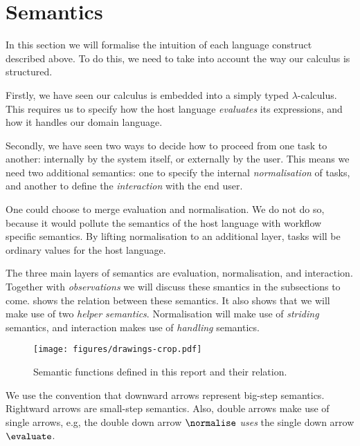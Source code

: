 


\section{Semantics}
\label{sec:semantics}

In this section we will formalise the intuition of each language construct described above.
To do this,
we need to take into account the way our calculus is structured.

Firstly,
we have seen our calculus is embedded into a simply typed $\lambda$-calculus.
This requires us to specify how the host language \emph{evaluates} its expressions,
and how it handles our domain language.

Secondly,
we have seen two ways to decide how to proceed from one task to another:
internally by the system itself, or externally by the user.
This means we need two additional semantics:
one to specify the internal \emph{normalisation} of tasks,
and another to define the \emph{interaction} with the end user.

One could choose to merge evaluation and normalisation.
We do not do so,
because it would pollute the semantics of the host language with workflow specific semantics.
By lifting normalisation to an additional layer,
tasks will be ordinary values for the host language.

The three main layers of semantics are evaluation, normalisation, and interaction.
Together with \emph{observations} we will discuss these smantics in the subsections to come.
 shows the relation between these semantics.
It also shows that we will make use of two \emph{helper semantics}.
Normalisation will make use of \emph{striding} semantics,
and interaction makes use of \emph{handling} semantics.

\begin{figure}[h]
  \centering
  \texttt{[image: figures/drawings-crop.pdf]}
  \caption{
    Semantic functions defined in this report and their relation.
  }
  \label{fig:semantic-functions}
\end{figure}

We use the convention that downward arrows represent big-step semantics.
Rightward arrows are small-step semantics.
Also, double arrows make use of single arrows,
e.g, the double down arrow $\normalise$ \emph{uses} the single down arrow $\evaluate$.



